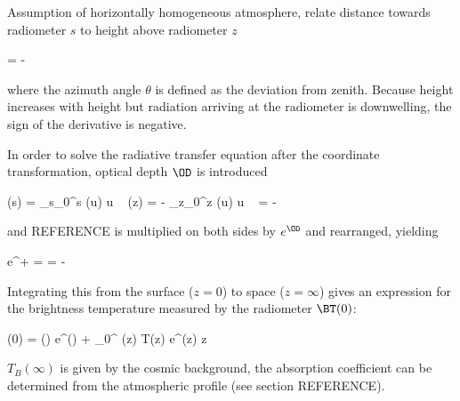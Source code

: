         Assumption of horizontally homogeneous atmosphere, relate distance
        towards radiometer $s$ to height above radiometer $z$

        \startformula
             = -  \EQCOMMA
        \stopformula

        where the azimuth angle $\theta$ is defined as the deviation from
        zenith.  Because height increases with height but radiation arriving at
        the radiometer is downwelling, the sign of the derivative is negative.

        In order to solve the radiative transfer equation after the coordinate
        transformation, optical depth $\OD$ is introduced

        \startformula
        \startalign[n=3,align={left,right,left}]
            \NC \NC \OD(s) = \NC \int_{s_0}^{s} \ABSCOEF(u) \diff u \NR
            \NC \Rightarrow~ \NC \OD(z) = \NC
                -  \int_{z_0}^{z} \ABSCOEF(u) \diff u \NR
            \NC \Rightarrow~ \NC {} = \NC
                - \frac{\ABSCOEF}{\cos(\theta)} \EQCOMMA \NR
        \stopalign
        \stopformula

        and REFERENCE is multiplied on both sides by $e^{\OD}$ and
        rearranged, yielding

        \startformula
             e^\OD + 
            = 
            = -  \EQSTOP
        \stopformula

        Integrating this from the surface ($z = 0$) to space ($z = \infty$)
        gives an expression for the brightness temperature measured by the
        radiometer $\BT(0)$:

        \startformula
            \BT(0) = \BT(\infty) e^{\OD(\infty)} + 
                \int_{0}^{\infty} \ABSCOEF(z) T(z) e^{\OD(z)} \diff z \EQSTOP
        \stopformula

        $T_B(\infty)$ is given by the cosmic background, the absorption
        coefficient can be determined from the atmospheric profile (see
        section REFERENCE).

    \stopsubsection

    \startsubsection[title={Vertical Discretization}]
        
    \stopsubsection

\stopsection


\startsection[title=Representation of the Atmospheric State]

